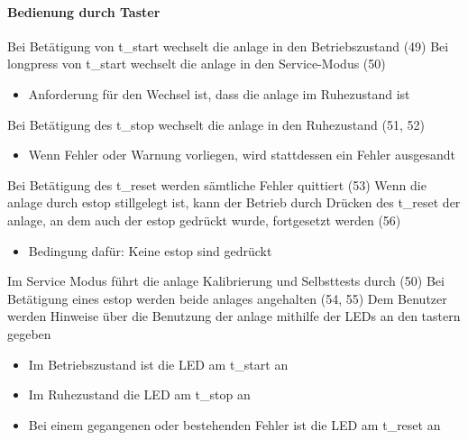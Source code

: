 \paragraph{Bedienung durch Taster}
\begin{itemize}
     Bei Betätigung von \gls{t_start} wechselt die \gls{anlage} in den Betriebszustand (49)
     Bei \gls{longpress} von \gls{t_start} wechselt die \gls{anlage} in den Service-Modus (50)
    \begin{itemize}
        \item Anforderung für den Wechsel ist, dass die \gls{anlage} im Ruhezustand ist
    \end{itemize}
     Bei Betätigung des \gls{t_stop} wechselt die \gls{anlage} in den Ruhezustand (51, 52)
    \begin{itemize}
        \item Wenn Fehler oder Warnung vorliegen, wird stattdessen ein Fehler ausgesandt  %
    \end{itemize}
     Bei Betätigung des \gls{t_reset} werden sämtliche Fehler quittiert (53) %
     Wenn die \gls{anlage} durch \gls{estop} stillgelegt ist, kann der Betrieb durch Drücken des
    \gls{t_reset} der \gls{anlage}, an dem auch der \gls{estop} gedrückt wurde, fortgesetzt werden (56) %
    \begin{itemize}
        \item Bedingung dafür: Keine \gls{estop} sind gedrückt
    \end{itemize}
     Im Service Modus führt die \gls{anlage} Kalibrierung und Selbsttests durch (50) %
     Bei Betätigung eines \gls{estop} werden beide \glspl{anlage} angehalten (54, 55)
     Dem Benutzer werden Hinweise über die Benutzung der \gls{anlage} mithilfe der LEDs an den \gls{taster}n gegeben
    \begin{itemize}
        \item Im Betriebszustand ist die LED am \gls{t_start} an
        \item Im Ruhezustand die LED am \gls{t_stop} an
        \item Bei einem gegangenen oder bestehenden Fehler ist die LED am \gls{t_reset} an
    \end{itemize}
\end{itemize}


